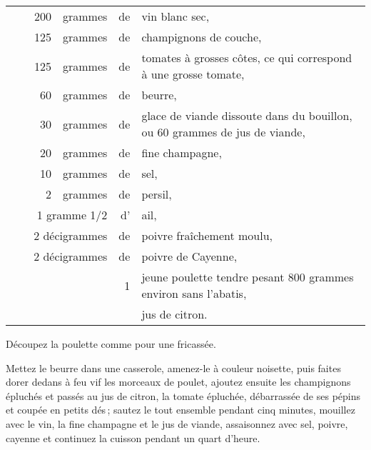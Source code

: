 \footnotesize
\begin{longtable}{rrrrrp{18em}}
  & \hspace{2em}    & 200 & grammes & de & vin blanc sec,                                                 \\
  & &  125 & grammes & de & champignons de couche,                                                        \\
  & &  125 & grammes & de & tomates à grosses côtes, ce qui correspond à une grosse tomate,               \\
  & &   60 & grammes & de & beurre,                                                                       \\
  & &   30 & grammes & de & glace de viande dissoute dans du bouillon, ou 60 grammes de jus de viande,    \\
  & &   20 & grammes & de & fine champagne,                                                               \\
  & &   10 & grammes & de & sel,                                                                          \\
  & &    2 & grammes & de & persil,                                                                       \\
  & \multicolumn{3}{r}{1 gramme 1/2}  & d' & ail,                                                         \\
  & \multicolumn{3}{r}{2 décigrammes} & de & poivre fraîchement moulu,                                    \\
  & \multicolumn{3}{r}{2 décigrammes} & de & poivre de Cayenne,                                           \\
  & &     &         &  1 & jeune poulette tendre pesant 800 grammes environ sans l'abatis,                \\
  & &     &         &    & jus de citron.                                                                 \\
\end{longtable}
\normalsize

Découpez la poulette comme pour une fricassée.

Mettez le beurre dans une casserole, amenez-le à couleur noisette, puis faites
dorer dedans à feu vif les morceaux de poulet, ajoutez ensuite les champignons
épluchés et passés au jus de citron, la tomate épluchée, débarrassée de ses
pépins et coupée en petits dés ; sautez le tout ensemble pendant cinq minutes,
mouillez avec le vin, la fine champagne et le jus de viande, assaisonnez avec
sel, poivre, cayenne et continuez la cuisson pendant un quart d'heure.


